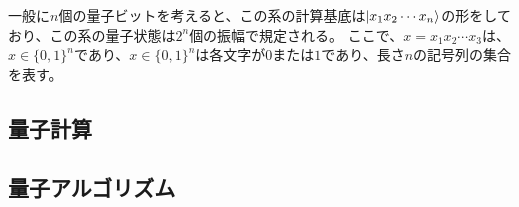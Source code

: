 \documentclass[platex,dvipdfmx, titlepage]{jlreq}			%
\begin{document}
一般に$n$個の量子ビットを考えると、この系の計算基底は$\ket{x_1 x_2 \cdots x_n}$の形をしており、この系の量子状態は$2^n$個の振幅で規定される。
ここで、$x = x_1 x_2 \cdots x_3$は、$x \in \{ 0, 1 \}^n$であり、$x \in \{ 0, 1 \}^n$は各文字が$0$または$1$であり、長さ$n$の記号列の集合を表す。

\subsection{量子計算}

\subsection{量子アルゴリズム}



\end{document}
